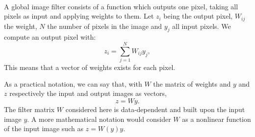 \paragraph{}
A global image filter consists of a function which outputs one pixel, taking all pixels as input and applying weights to them.
Let \(z_i\) being the output pixel, \(W_{ij}\) the weight, \(N\) the number of pixels in the image and \(y_j\) all input pixels.
We compute an output pixel with:
\[z_i = \sum^{N}_{j=1} W_{ij}y_j,\]
This means that a vector of weights exists for each pixel.

As a practical notation, we can say that, with \(W\) the matrix of weights and \(y\) and \(z\) respectively the input and output images as vectors,
\[z = Wy.\]
The filter matrix \(W\) considered here is data-dependent and built upon the input image \(y\).
A more mathematical notation would consider \(W\) as a nonlinear function of the input image such as \(z = W(y) y\).
